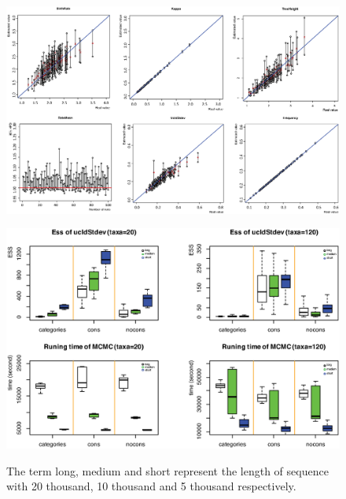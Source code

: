 \documentclass{bmcart}
\begin{document}
\begin{backmatter}
\begin{figure}[h!]
\includegraphics[width=12cm]{LargeTree.eps}\\
\caption{
             }
\label{LargeTree}
\end{figure}

\begin{figure}[h!]
\includegraphics[width=12cm]{Efficiency.eps}\\
\caption{
             The term long, medium and short represent the length of sequence with 20 thousand, 10 thousand and 5 thousand respectively.}
\label{eff_comp}
\end{figure}


\end{backmatter}
\end{document}
